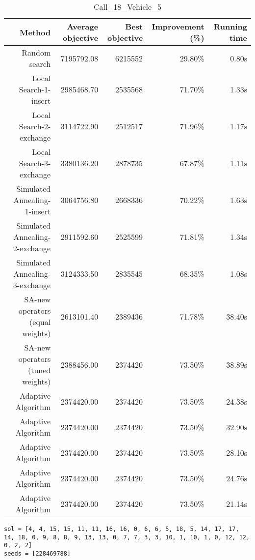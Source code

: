 \begin{table}[ht]
\centering
\caption{Call\_18\_Vehicle\_5}
\label{tab:call18vehicle5}
\begin{tabular}{|r|r|r|r|r|}
Method & Average objective & Best objective & Improvement (\%) & Running time \\
\hline
Random search & 7195792.08 & 6215552 & 29.80\% & 0.80s\\
Local Search-1-insert & 2985468.70 & 2535568 & 71.70\% & 1.33s\\
Local Search-2-exchange & 3114722.90 & 2512517 & 71.96\% & 1.17s\\
Local Search-3-exchange & 3380136.20 & 2878735 & 67.87\% & 1.11s\\
Simulated Annealing-1-insert & 3064756.80 & 2668336 & 70.22\% & 1.63s\\
Simulated Annealing-2-exchange & 2911592.60 & 2525599 & 71.81\% & 1.34s\\
Simulated Annealing-3-exchange & 3124333.50 & 2835545 & 68.35\% & 1.08s\\
SA-new operators (equal weights) & 2613101.40 & 2389436 & 71.78\% & 38.40s\\
SA-new operators (tuned weights) & 2388456.00 & 2374420 & 73.50\% & 38.89s\\
Adaptive Algorithm & 2374420.00 & 2374420 & 73.50\% & 24.38s\\
Adaptive Algorithm & 2374420.00 & 2374420 & 73.50\% & 32.90s\\
Adaptive Algorithm & 2374420.00 & 2374420 & 73.50\% & 28.10s\\
Adaptive Algorithm & 2374420.00 & 2374420 & 73.50\% & 24.76s\\
Adaptive Algorithm & 2374420.00 & 2374420 & 73.50\% & 21.14s\\
\end{tabular}%
\end{table}
\begin{lstlisting}[label={lst:call18vehicle5},caption=Optimal solution call\_18\_vehicle\_5]
sol = [4, 4, 15, 15, 11, 11, 16, 16, 0, 6, 6, 5, 18, 5, 14, 17, 17, 14, 18, 0, 9, 8, 8, 9, 13, 13, 0, 7, 7, 3, 3, 10, 1, 10, 1, 0, 12, 12, 0, 2, 2]
seeds = [228469788]
\end{lstlisting}%
\clearpage


